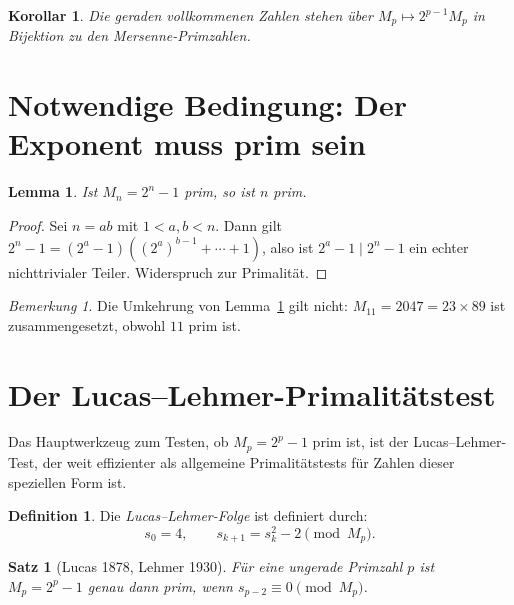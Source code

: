 \documentclass[12pt,a4paper]{amsart}
\newtheorem{lemma}[theorem]{Lemma}
\newtheorem{satz}[theorem]{Satz}
\newtheorem{korollar}[theorem]{Korollar}
\theoremstyle{definition}
\newtheorem{definition_de}[theorem]{Definition}
\theoremstyle{remark}
\newtheorem{bemerkung}[theorem]{Bemerkung}
\begin{document}
\begin{korollar}
Die geraden vollkommenen Zahlen stehen über $M_p \mapsto 2^{p-1} M_p$
in Bijektion zu den Mersenne-Primzahlen.
\end{korollar}

\section{Notwendige Bedingung: Der Exponent muss prim sein}

\begin{lemma}
\label{lem:exprim}
Ist $M_n = 2^n - 1$ prim, so ist $n$ prim.
\end{lemma}

\begin{proof}
Sei $n = ab$ mit $1 < a, b < n$. Dann gilt
$2^n - 1 = (2^a - 1)((2^a)^{b-1} + \cdots + 1)$,
also ist $2^a - 1 \mid 2^n - 1$ ein echter nichttrivialer Teiler.
Widerspruch zur Primalität.
\end{proof}

\begin{bemerkung}
Die Umkehrung von Lemma~\ref{lem:exprim} gilt nicht:
$M_{11} = 2047 = 23 \times 89$ ist zusammengesetzt, obwohl $11$ prim ist.
\end{bemerkung}

\section{Der Lucas--Lehmer-Primalitätstest}

Das Hauptwerkzeug zum Testen, ob $M_p = 2^p - 1$ prim ist, ist der
Lucas--Lehmer-Test, der weit effizienter als allgemeine Primalitätstests
für Zahlen dieser speziellen Form ist.

\begin{definition_de}
Die \emph{Lucas--Lehmer-Folge} ist definiert durch:
\[
  s_0 = 4, \qquad s_{k+1} = s_k^2 - 2 \pmod{M_p}.
\]
\end{definition_de}

\begin{satz}[Lucas 1878, Lehmer 1930]
\label{satz:LL}
Für eine ungerade Primzahl $p$ ist $M_p = 2^p - 1$ genau dann prim, wenn
$s_{p-2} \equiv 0 \pmod{M_p}$.
\end{satz}
\end{document}
